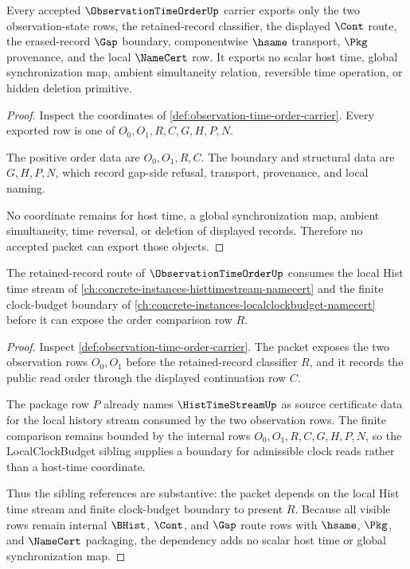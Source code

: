 \begin{theorem}
\label{thm:observation-time-order-no-host-time-nonescape}
Every accepted $\ObservationTimeOrderUp$ carrier exports only the two observation-state rows, the retained-record classifier, the displayed $\Cont$ route, the erased-record $\Gap$ boundary, componentwise $\hsame$ transport, $\Pkg$ provenance, and the local $\NameCert$ row. It exports no scalar host time, global synchronization map, ambient simultaneity relation, reversible time operation, or hidden deletion primitive.
\end{theorem}
\begin{proof}
Inspect the coordinates of \autoref{def:observation-time-order-carrier}. Every exported row is one of $O_0,O_1,R,C,G,H,P,N$.

The positive order data are $O_0,O_1,R,C$. The boundary and structural data are $G,H,P,N$, which record gap-side refusal, transport, provenance, and local naming.

No coordinate remains for host time, a global synchronization map, ambient simultaneity, time reversal, or deletion of displayed records. Therefore no accepted packet can export those objects.
\end{proof}

\begin{theorem}
\label{thm:observation-time-order-hist-time-stream-dependency}
The retained-record route of $\ObservationTimeOrderUp$ consumes the local Hist time stream of \autoref{ch:concrete-instances-histtimestream-namecert} and the finite clock-budget boundary of \autoref{ch:concrete-instances-localclockbudget-namecert} before it can expose the order comparison row $R$.
\end{theorem}
\begin{proof}
Inspect \autoref{def:observation-time-order-carrier}. The packet exposes the two observation rows $O_0,O_1$ before the retained-record classifier $R$, and it records the public read order through the displayed continuation row $C$.

The package row $P$ already names $\HistTimeStreamUp$ as source certificate data for the local history stream consumed by the two observation rows. The finite comparison remains bounded by the internal rows $O_0,O_1,R,C,G,H,P,N$, so the LocalClockBudget sibling supplies a boundary for admissible clock reads rather than a host-time coordinate.

Thus the sibling references are substantive: the packet depends on the local Hist time stream and finite clock-budget boundary to present $R$. Because all visible rows remain internal $\BHist$, $\Cont$, and $\Gap$ route rows with $\hsame$, $\Pkg$, and $\NameCert$ packaging, the dependency adds no scalar host time or global synchronization map.
\end{proof}

